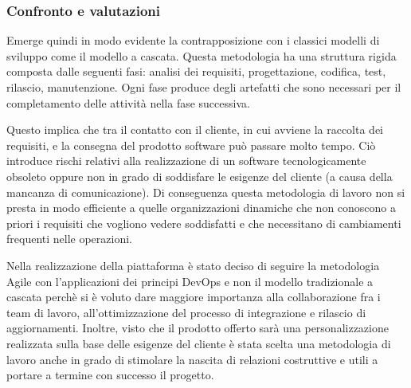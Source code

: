 \subsubsection{Confronto e valutazioni}
Emerge quindi in modo evidente la contrapposizione con i classici modelli di sviluppo come il modello a cascata.
Questa metodologia ha una struttura rigida composta dalle seguenti fasi: analisi dei requisiti, progettazione, codifica, test, rilascio, manutenzione.
Ogni fase produce degli artefatti che sono necessari per il completamento delle attività nella fase successiva.

Questo implica che tra il contatto con il cliente, in cui avviene la raccolta dei requisiti, e la consegna del prodotto software può passare molto tempo.
Ciò introduce rischi relativi alla realizzazione di un software tecnologicamente obsoleto oppure non in grado di soddisfare le
esigenze del cliente (a causa della mancanza di comunicazione).
Di conseguenza questa metodologia di lavoro non si presta in modo efficiente a quelle organizzazioni dinamiche che non conoscono
a priori i requisiti che vogliono vedere soddisfatti e che necessitano di cambiamenti frequenti nelle operazioni.

Nella realizzazione della piattaforma è stato deciso di seguire la metodologia Agile con l'applicazioni dei principi DevOps e non il modello tradizionale a cascata
perchè si è voluto dare maggiore importanza alla collaborazione fra i team di lavoro, all'ottimizzazione del processo di integrazione e rilascio di aggiornamenti.
Inoltre, visto che il prodotto offerto sarà una personalizzazione realizzata sulla base delle esigenze del cliente
è stata scelta una metodologia di lavoro anche in grado di stimolare la nascita di relazioni costruttive e utili a portare a termine con successo il progetto.


